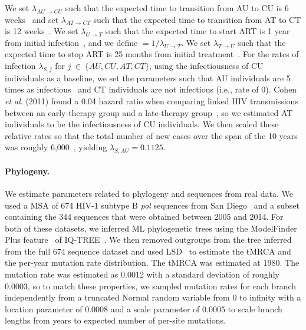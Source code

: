 We set $\lambda_{AU \rightarrow CU}$ such that the expected time to transition from AU to CU is 6 weeks~\cite{Bellan2015a} and set $\lambda_{AT \rightarrow CT}$ such that the expected time to transition from AT to CT is 12 weeks~\cite{Cohen2011}. We set $\lambda_{U \rightarrow T}$ such that the expected time to start ART is 1 year from initial infection~\cite{OBrien2012}, and we define \EART$=1/\lambda_{U \rightarrow T}$. We set $\lambda_{T \rightarrow U}$ such that the expected time to stop ART is 25 months from initial treatment~\cite{Nosyk2015}. For the rates of infection $\lambda_{S,j}$ for $j~\in~\{AU,CU,AT,CT\}$, using the infectiousness of CU individuals as a baseline, we set the parameters such that AU individuals are 5 times as infectious~\cite{Wawer2005} and CT individuals are not infectious (i.e., rate of 0). Cohen \textit{et al}. (2011) found a 0.04 hazard ratio when comparing linked \gls{HIV} transmissions between an early-therapy group and a late-therapy group~\cite{Cohen2011}, so we estimated AT individuals to be  the infectiousness of CU individuals. We then scaled these relative rates so that the total number of new cases over the span of the 10 years was roughly 6,000~\cite{Macchione2015}, yielding $\lambda_{S,AU}= 0.1125$.

\paragraph{Phylogeny.}  We estimate parameters related to phylogeny and sequences from real data. We used a \gls{MSA} of 674 \gls{HIV}-1 subtype B \textit{pol} sequences from San Diego~\cite{Little2014} and a subset containing the 344 sequences that were obtained between 2005 and 2014. For both of these datasets, we inferred \gls{ML} phylogenetic trees using the ModelFinder Plus feature~\cite{Kalyaanamoorthy2017} of IQ-TREE~\cite{Chernomor2016}. We then removed outgroups from the tree inferred from the full 674 sequence dataset and used LSD~\cite{To2016} to estimate the \gls{tMRCA} and the per-year mutation rate distribution. The \gls{tMRCA} was estimated at 1980. The mutation rate was estimated as 0.0012 with a standard deviation of roughly 0.0003, so to match these properties, we sampled mutation rates for each branch independently from a truncated Normal random variable from 0 to infinity with a location parameter of 0.0008 and a scale parameter of 0.0005 to scale branch lengths from years to expected number of per-site mutations.

